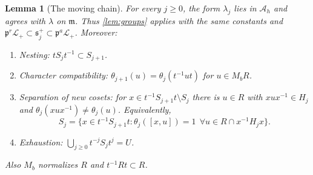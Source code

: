 \documentclass[11pt,reqno]{amsart}
\numberwithin{equation}{section}
\theoremstyle{plain}
\newtheorem{lemma}[theorem]{Lemma}
\theoremstyle{definition}
\theoremstyle{remark}
\theoremstyle{plain}
\newcommand{\pp}{\mathfrak{p}}   %
\newcommand{\Lat}{\mathcal{L}}   %
\newcommand{\g}{\mathfrak{g}}    %
\newcommand{\m}{\mathfrak{m}}    %
\newcommand{\sS}{\mathfrak{s}^+}   %
\newcommand{\lf}{\lambda}
\begin{document}
\begin{lemma}[The moving chain]\label{lem:chain}
For every $j\ge0$, the form $\lf_j$ lies in $\mathcal A_h$ and agrees
with $\lf$ on $\m$.
Thus \cref{lem:groups} applies with the same constants and
$\pp^r\Lat_+\subset\sS_j\subset\pp^a\Lat_+$.
Moreover:
\begin{enumerate}[label=\textup{(\alph*)},ref=\alph*]
\item\label{item:crit-incl} \emph{Nesting:}
$tS_jt^{-1}\subset S_{j+1}$.
\item\label{item:crit-cov} \emph{Character compatibility:}
$\theta_{j+1}(u)=\theta_j(t^{-1}ut)$ for $u\in M_bR$.
\item\label{item:crit-nondeg} \emph{Separation of new cosets:}
for $x\in t^{-1}S_{j+1}t\setminus S_j$ there is $u\in R$ with
$xux^{-1}\in H_j$ and $\theta_j(xux^{-1})\ne\theta_j(u)$.
Equivalently,
\[
S_j=\{x\in t^{-1}S_{j+1}t:\theta_j([x,u])=1
\ \ \forall u\in R\cap x^{-1}H_jx\}.
\]
\item\label{item:crit-exhaust} \emph{Exhaustion:}
$\bigcup_{j\ge0}t^{-j}S_jt^j=U$.
\end{enumerate}
Also $M_b$ normalizes $R$ and $t^{-1}Rt\subset R$.
\end{lemma}
\end{document}
